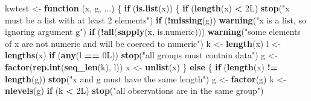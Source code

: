 \documentclass[
]{article}
\newenvironment{Shaded}{\begin{snugshade}}{\end{snugshade}}
\newcommand{\ControlFlowTok}[1]{\textcolor[rgb]{0.13,0.29,0.53}{\textbf{#1}}}
\newcommand{\DataTypeTok}[1]{\textcolor[rgb]{0.13,0.29,0.53}{#1}}
\newcommand{\DecValTok}[1]{\textcolor[rgb]{0.00,0.00,0.81}{#1}}
\newcommand{\FunctionTok}[1]{\textcolor[rgb]{0.13,0.29,0.53}{\textbf{#1}}}
\newcommand{\NormalTok}[1]{#1}
\newcommand{\OtherTok}[1]{\textcolor[rgb]{0.56,0.35,0.01}{#1}}
\newcommand{\SpecialCharTok}[1]{\textcolor[rgb]{0.81,0.36,0.00}{\textbf{#1}}}
\newcommand{\StringTok}[1]{\textcolor[rgb]{0.31,0.60,0.02}{#1}}
\begin{document}
\begin{Shaded}
\begin{Highlighting}[]
\NormalTok{kwtest }\OtherTok{\textless{}{-}} \ControlFlowTok{function}\NormalTok{ (x, g, ...) }
\NormalTok{\{}
    \ControlFlowTok{if}\NormalTok{ (}\FunctionTok{is.list}\NormalTok{(x)) \{}
        \ControlFlowTok{if}\NormalTok{ (}\FunctionTok{length}\NormalTok{(x) }\SpecialCharTok{\textless{}} \DecValTok{2}\DataTypeTok{L}\NormalTok{) }
            \FunctionTok{stop}\NormalTok{(}\StringTok{"\textquotesingle{}x\textquotesingle{} must be a list with at least 2 elements"}\NormalTok{)}
        \ControlFlowTok{if}\NormalTok{ (}\SpecialCharTok{!}\FunctionTok{missing}\NormalTok{(g)) }
            \FunctionTok{warning}\NormalTok{(}\StringTok{"\textquotesingle{}x\textquotesingle{} is a list, so ignoring argument \textquotesingle{}g\textquotesingle{}"}\NormalTok{)}
        \ControlFlowTok{if}\NormalTok{ (}\SpecialCharTok{!}\FunctionTok{all}\NormalTok{(}\FunctionTok{sapply}\NormalTok{(x, is.numeric))) }
            \FunctionTok{warning}\NormalTok{(}\StringTok{"some elements of \textquotesingle{}x\textquotesingle{} are not numeric and will be coerced to numeric"}\NormalTok{)}
\NormalTok{        k }\OtherTok{\textless{}{-}} \FunctionTok{length}\NormalTok{(x)}
\NormalTok{        l }\OtherTok{\textless{}{-}} \FunctionTok{lengths}\NormalTok{(x)}
        \ControlFlowTok{if}\NormalTok{ (}\FunctionTok{any}\NormalTok{(l }\SpecialCharTok{==} \DecValTok{0}\DataTypeTok{L}\NormalTok{)) }
            \FunctionTok{stop}\NormalTok{(}\StringTok{"all groups must contain data"}\NormalTok{)}
\NormalTok{        g }\OtherTok{\textless{}{-}} \FunctionTok{factor}\NormalTok{(}\FunctionTok{rep.int}\NormalTok{(}\FunctionTok{seq\_len}\NormalTok{(k), l))}
\NormalTok{        x }\OtherTok{\textless{}{-}} \FunctionTok{unlist}\NormalTok{(x)}
\NormalTok{    \}}
    \ControlFlowTok{else}\NormalTok{ \{}
        \ControlFlowTok{if}\NormalTok{ (}\FunctionTok{length}\NormalTok{(x) }\SpecialCharTok{!=} \FunctionTok{length}\NormalTok{(g)) }
            \FunctionTok{stop}\NormalTok{(}\StringTok{"\textquotesingle{}x\textquotesingle{} and \textquotesingle{}g\textquotesingle{} must have the same length"}\NormalTok{)}
\NormalTok{        g }\OtherTok{\textless{}{-}} \FunctionTok{factor}\NormalTok{(g)}
\NormalTok{        k }\OtherTok{\textless{}{-}} \FunctionTok{nlevels}\NormalTok{(g)}
        \ControlFlowTok{if}\NormalTok{ (k }\SpecialCharTok{\textless{}} \DecValTok{2}\DataTypeTok{L}\NormalTok{) }
            \FunctionTok{stop}\NormalTok{(}\StringTok{"all observations are in the same group"}\NormalTok{)}

\end{Highlighting}
\end{Shaded}
\end{document}
